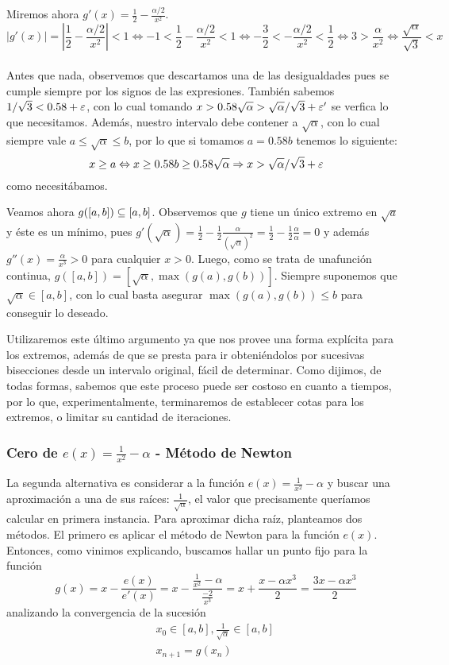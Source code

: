  Miremos ahora $ g'(x) = \frac{1}{2} - \frac{\alpha/2}{x^2}$.\\
$$ |g'(x)| = |\frac{1}{2} - \frac{\alpha/2}{x^2}|  < 1  
\Leftrightarrow  -1 < \frac{1}{2} - \frac{\alpha/2}{x^2} < 1 
	\Leftrightarrow  -\frac{3}{2} <  - \frac{\alpha/2}{x^2}  < \frac{1}{2}  \Leftrightarrow 3 >  \frac{\alpha}{x^2}  
	\Leftrightarrow  \frac{\sqrt{\alpha}}{\sqrt{3}} < x $$\\
Antes que nada, observemos que descartamos una de las desigualdades pues se cumple siempre por los signos de las expresiones. También sabemos $1/\sqrt{3} < 0.58 + \varepsilon$, con lo cual tomando $x > 0.58\sqrt{\alpha} > \sqrt{\alpha}/\sqrt{3} + \varepsilon'$ se verfica lo que necesitamos. Además, nuestro intervalo debe contener a $\sqrt{\alpha}$, con lo cual siempre vale $a \leq \sqrt{\alpha} \leq b$, por lo que si tomamos $a = 0.58b$ tenemos lo siguiente:
$$x \geq a \Leftrightarrow x \geq 0.58b \geq 0.58\sqrt{\alpha} \Rightarrow x > \sqrt{\alpha}/\sqrt{3} + \varepsilon$$ 
como necesitábamos. 

Veamos ahora $g([a,b]) \subseteq [a,b]$. Observemos que $g$ tiene un único extremo en $\sqrt{a}$ y éste es un mínimo, pues $g'(\sqrt{\alpha}) = \frac{1}{2} - \frac{1}{2}\frac{\alpha}{(\sqrt{\alpha})^2} = \frac{1}{2} - \frac{1}{2}\frac{\alpha}{\alpha} = 0$ y además $g''(x) = \frac{\alpha}{x^3} >0$ para cualquier $x>0$. Luego, como se trata de unafunción continua, $g([a,b]) = [\sqrt{\alpha}, \max(g(a), g(b))]$. Siempre suponemos que $\sqrt{\alpha}\in[a,b]$, con lo cual basta asegurar $\max(g(a), g(b))\leq b$ para conseguir lo deseado.

Utilizaremos este último argumento ya que nos provee una forma explícita para los extremos, además de que se presta para ir obteniéndolos por sucesivas bisecciones desde un intervalo original, fácil de determinar. Como dijimos, de todas formas, sabemos que este proceso puede ser costoso en cuanto a tiempos, por lo que, experimentalmente, terminaremos de establecer cotas para los extremos, o limitar su cantidad de iteraciones.

		\subsubsection{Cero de $e(x) = \frac{1}{x^2} - \alpha$ - M\'etodo de Newton}
		La segunda alternativa es considerar a la función $e(x) = \frac{1}{x^2} - \alpha$ y buscar una aproximación a una de sus raíces: $\frac{1}{\sqrt{\alpha}}$, el valor que precisamente queríamos calcular en primera instancia. Para aproximar dicha raíz, planteamos dos métodos. El primero es aplicar el método de Newton para la función $e(x)$. Entonces, como vinimos explicando, buscamos hallar un punto fijo para la función
		\begin{equation}
			g(x) = x - \frac{e(x)}{e'(x)} = x - \frac{\frac{1}{x^2} - \alpha}{\frac{-2}{x^3}} = x + \frac{x - \alpha x^3}{2} = \frac{3x - \alpha x^3}{2}
		\label{g_e}
		\end{equation}
analizando la convergencia de la sucesión
		\begin{eqnarray}
		  && x_0 \in [a,b], \frac{1}{\sqrt{\alpha}} \in [a,b] \nonumber \\
		  && x_{n+1} = g(x_n) \nonumber
		\end{eqnarray}
		
